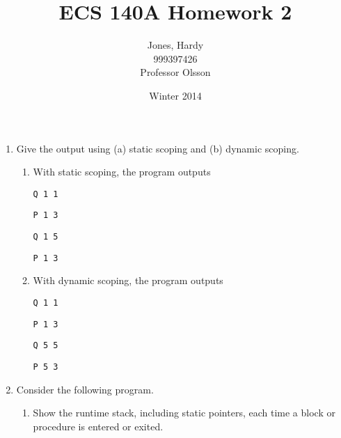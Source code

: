 \documentclass[12pt,letterpaper]{article}
\title{ECS 140A Homework 2\vspace{-2ex}}
\author{Jones, Hardy\\
        999397426\\
        Professor Olsson\vspace{-2ex}}
\date{Winter 2014}
\begin{document}
  \maketitle

  \begin{enumerate}
    \item Give the output using (a) static scoping and (b) dynamic scoping.

    \begin{enumerate}
      \item
        With static scoping, the program outputs

        \texttt{Q 1 1}

        \texttt{P 1 3}

        \texttt{Q 1 5}

        \texttt{P 1 3}

      \item
        With dynamic scoping, the program outputs

        \texttt{Q 1 1}

        \texttt{P 1 3}

        \texttt{Q 5 5}

        \texttt{P 5 3}

    \end{enumerate}

    \item Consider the following program.
      \begin{enumerate}
        \item Show the runtime stack, including static pointers,
          each time a block or procedure is entered or exited.


\end{enumerate}
\end{enumerate}
\end{document}

